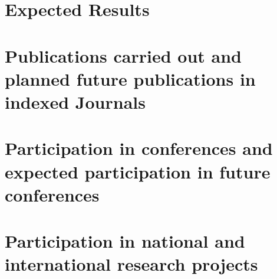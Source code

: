 \section{Expected Results}
\vspace{5cm}

\section{Publications carried out and planned future publications in indexed Journals}
\vspace{3cm}

\section{Participation in conferences and expected participation in future conferences}
\vspace{3cm}

\section{Participation in national and international research projects}
\endinput